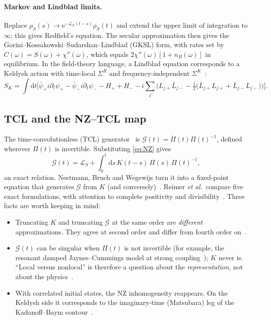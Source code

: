 \documentclass[11pt]{article}
\newcommand{\Lc}{\mathcal{L}}
\newcommand{\Gc}{\mathcal{G}}
\newcommand{\ee}{\mathrm{e}}
\newcommand{\dd}{\mathrm{d}}
\begin{document}
\paragraph{Markov and Lindblad limits.}
Replace $\rho_S(s)\to\ee^{-\Lc_S(t-s)}\rho_S(t)$ and extend the upper limit of integration to
$\infty$; this gives Redfield's equation. The secular approximation then gives the
Gorini--Kossakowski--Sudarshan--Lindblad (GKSL) form, with rates set by
$C(\omega)=S(\omega)+\chi''(\omega)$, which equals $2\chi''(\omega)[1+n_B(\omega)]$ in equilibrium. In the field-theory
language, a Lindblad equation corresponds to a Keldysh action with time-local
$\Sigma^R$ and frequency-independent $\Sigma^K$~\cite{Sieberer2016}:
\begin{equation}
  S_K=\int\!\dd t\Big[\bar\psi_+ i\partial_t\psi_+-\bar\psi_- i\partial_t\psi_- -H_++H_-
  -i\sum_j\Big(L_{j+}\bar L_{j-}-\tfrac12\big(\bar L_{j+}L_{j+}+\bar L_{j-}L_{j-}\big)\Big)\Big].
\end{equation}

\subsection{TCL and the NZ--TCL map}
The time-convolutionless (TCL) generator~\cite{Shibata1977,Chaturvedi1979} is
$\Gc(t)=\dot\Pi(t)\Pi(t)^{-1}$, defined wherever $\Pi(t)$ is invertible. Substituting \cref{eq:NZ} gives
\begin{equation}
  \Gc(t)=\Lc_S+\int_0^t\!\dd s\,K(t-s)\,\Pi(s)\,\Pi(t)^{-1},
  \label{eq:TCLNZ}
\end{equation}
an exact relation. Nestmann, Bruch and Wegewijs turn it into a fixed-point equation that
generates $\Gc$ from $K$ (and conversely)~\cite{Nestmann2021}. Reimer
\emph{et al.}\ compare five exact formulations, with attention to complete positivity
and divisibility~\cite{Reimer2019}. Three facts are worth keeping in mind:
\begin{itemize}\itemsep0pt
\item Truncating $K$ and truncating $\Gc$ at the same order are \emph{different} approximations.
  They agree at second order and differ from fourth order on~\cite{LeijnseWegewijs2008,Timm2008,Timm2011}.
\item $\Gc(t)$ can be singular when $\Pi(t)$ is not invertible (for example, the resonant damped
  Jaynes--Cummings model at strong coupling~\cite{BreuerPetruccione}); $K$ never is.
  ``Local versus nonlocal'' is therefore a question about the \emph{representation}, not
  about the physics~\cite{ChruscinskiKossakowski2010}.
\item With correlated initial states, the NZ inhomogeneity reappears. On the Keldysh side
  it corresponds to the imaginary-time (Matsubara) leg of the Kadanoff--Baym
  contour~\cite{StefanucciVanLeeuwen}.
\end{itemize}
\end{document}
